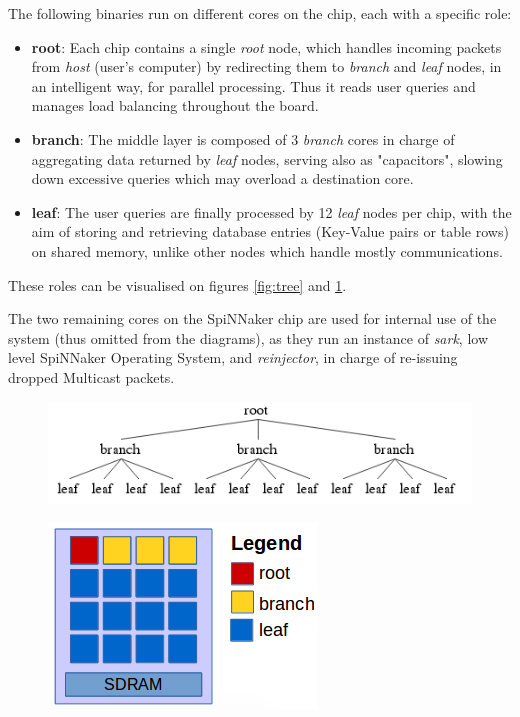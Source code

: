 The following binaries run on different cores on the chip, each with a specific role:
\begin{itemize}
	\item \textbf{root}: Each chip contains a single \textit{root} node, which handles incoming packets from \textit{host} (user's computer) by redirecting them to \textit{branch} and \textit{leaf} nodes, in an intelligent way, for parallel processing. Thus it reads user queries and manages load balancing throughout the board.
	\item \textbf{branch}: The middle layer is composed of 3 \textit{branch} cores in charge of aggregating data returned by \textit{leaf} nodes, serving also as "capacitors", slowing down excessive queries which may overload a destination core.
	\item \textbf{leaf}: The user queries are finally processed by 12 \textit{leaf} nodes per chip, with the aim of storing and retrieving database entries (Key-Value pairs or table rows) on shared memory, unlike other nodes which handle mostly communications.
\end{itemize}
	These roles can be visualised on figures \ref{fig:tree} and \ref{fig:tree-chip}.
	
	The two remaining cores on the SpiNNaker chip are used for internal use of the system (thus omitted from the diagrams), as they run an instance of \textit{sark}, low level SpiNNaker Operating System, and \textit{reinjector}, in charge of re-issuing dropped Multicast packets.
 
\begin{figure}
\centering
\begin{minipage}{1\textwidth}
  \centering
  \includegraphics[width=0.9\linewidth, natwidth=471, natheight=114]{images/tree.png}
  \label{fig:tree}
\end{minipage}
\begin{minipage}{1\textwidth}
  \centering
  \includegraphics[width=0.5\linewidth, natwidth=270, natheight=186]{images/tree-chip.png}
  \label{fig:tree-chip}
\end{minipage}
\end{figure}

